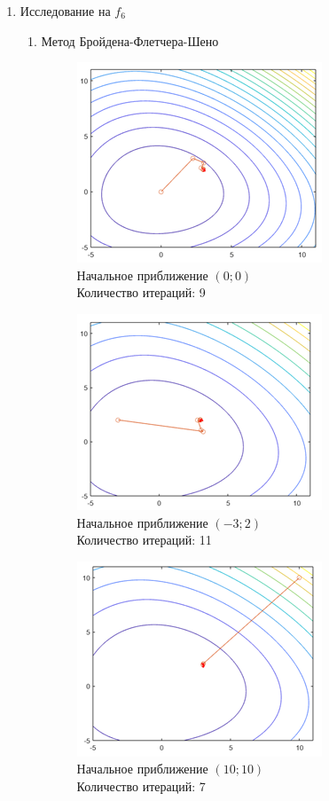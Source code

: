 \documentclass[12pt]{article}
\begin{document}
\begin{enumerate}
\begin{enumerate}
	\end{enumerate}

	\item Исследование на $f_6$
	\begin{enumerate}

	\item Метод Бройдена-Флетчера-Шено
	\begin{figure}[H]
	\begin{minipage}{.5\textwidth}
    	\centering
    	\includegraphics[]{img/f6_1_1.png}
    	\\ Начальное приближение $\left( 0; 0 \right)$
    	\\ Количество итераций: 9
	\end{minipage}
	\begin{minipage}{.5\textwidth}
    	\centering
    	\includegraphics[]{img/f6_1_2.png}
    	\\ Начальное приближение $\left( -3; 2 \right)$
    	\\ Количество итераций: 11
	\end{minipage}
    \end{figure}

	\begin{figure}[H]
    	\centering
    	\includegraphics[]{img/f6_1_3.png}
    	\\ Начальное приближение $\left( 10; 10 \right)$
    	\\ Количество итераций: 7
    \end{figure}


\end{enumerate}
\end{enumerate}
\end{document}

